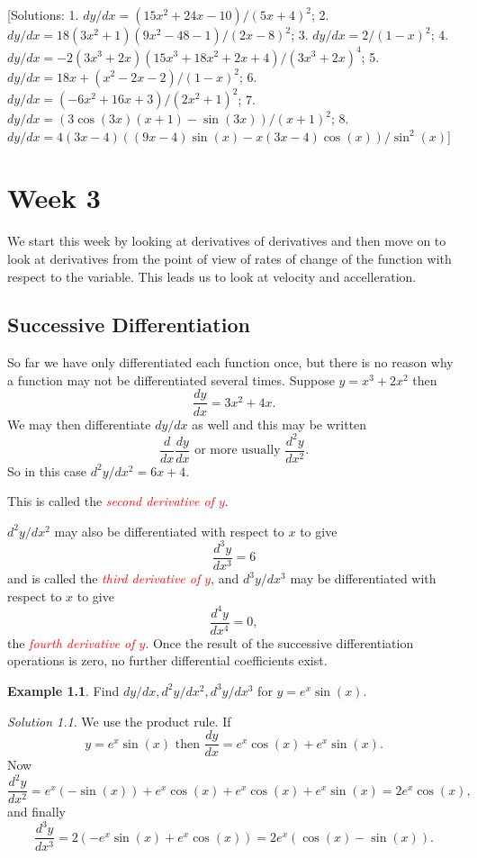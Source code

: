 \documentclass[
  11pt,
  oneside]{book}
\newcommand{\slide}{}
\theoremstyle{definition}
\theoremstyle{definition}
\newtheorem{example}{Example}[chapter]
\theoremstyle{definition}
\theoremstyle{definition}
\theoremstyle{remark}
\newtheorem*{solution}{Solution}
\begin{document}
\slide

{[}Solutions: 1. \(dy/dx = (15x^2+24x-10)/(5x+4)^2\); 2. \(dy/dx = 18(3x^2+1)(9x^2-48-1)/(2x-8)^2\); 3. \(dy/dx = 2/(1-x)^2\); 4. \(dy/dx = -2(3x^3+2x)(15x^3+18x^2+2x+4)/(3x^3+2x)^4\); 5. \(dy/dx = 18x+(x^2-2x-2)/(1-x)^2\); 6. \(dy/dx = (-6x^2+16x+3)/(2x^2+1)^2\); 7. \(dy/dx = (3\cos(3x)(x+1)-\sin(3x))/(x+1)^2\); 8. \(dy/dx = 4(3x-4)((9x-4)\sin(x)-x(3x-4)\cos(x))/\sin^2(x)\){]}

\chapter{Week 3}\label{week-three}

We start this week by looking at derivatives of derivatives and then move on to look at derivatives from the point of view of rates of change of the function with respect to the variable. This leads us to look at velocity and accelleration.
\slide

\section{Successive Differentiation}\label{lecture-seven}

So far we have only differentiated each function once, but there is no reason why a function may not be differentiated several times.
Suppose \(y = x^3 + 2x^2\) then
\[
\frac{dy}{dx} = 3x^2 + 4x.
\]
We may then differentiate \(dy/dx\) as well and this may be written
\[
\frac{d}{dx}\frac{dy}{dx}\text{ or more usually }\frac{d^2y}{dx^2}.
\]
So in this case \(d^2y/dx^2 = 6x+4\).

This is called the \textcolor{red}{\em second derivative of $y$}.
\slide

\(d^2y/dx^2\) may also be differentiated with respect to \(x\) to give
\[
\frac{d^3y}{dx^3} = 6
\]
and is called the \textcolor{red}{\em third derivative of $y$}, and \(d^3y/dx^3\) may be differentiated with respect to \(x\) to give
\[
\frac{d^4y}{dx^4} = 0,
\]
the \textcolor{red}{\em fourth derivative of $y$}. Once the result of the successive differentiation operations is zero, no further differential coefficients exist.
\slide

\begin{example}
Find \(dy/dx, d^2y/dx^2, d^3y/dx^3\) for \(y =e^x\sin(x)\).
\end{example}

\begin{solution}
We use the product rule. If
\[
y=e^x\sin(x)\text{ then }\frac{dy}{dx} = e^x\cos(x) + e^x\sin(x).
\]
Now
\[
\frac{d^2y}{dx^2} = e^x(-\sin(x)) + e^x\cos(x) + e^x\cos(x)+e^x\sin(x) = 2e^x\cos(x),
\]
and finally
\[
\frac{d^3y}{dx^3} = 2(-e^x\sin(x)+e^x\cos(x)) = 2e^x(\cos(x)-\sin(x)).
\]
\end{solution}
\end{document}
